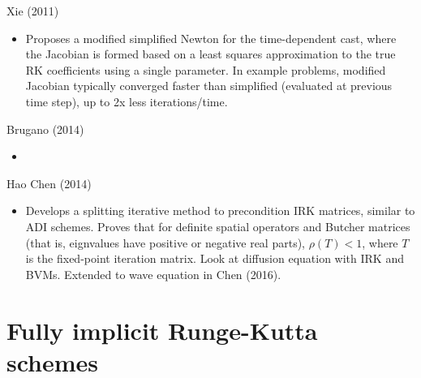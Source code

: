\documentclass[a4paper,10pt]{article}
\begin{document}
Xie (2011)
\begin{itemize}
	\item Proposes a modified simplified Newton for the time-dependent cast, where the Jacobian is
	formed based on a least squares approximation to the true RK coefficients using a single parameter. In example
	problems, modified Jacobian typically converged faster than simplified (evaluated at previous
	time step), up to 2x less iterations/time. 
\end{itemize}

Brugano (2014)
\begin{itemize}
	\item
\end{itemize}

Hao Chen (2014)
\begin{itemize}
	\item Develops a splitting iterative method to precondition IRK matrices, similar to ADI schemes.
	Proves that for definite spatial operators and Butcher matrices (that is, eignvalues have positive
	or negative real parts), $\rho(T) < 1$, where $T$ is the fixed-point iteration matrix. Look at 
	diffusion equation with IRK and BVMs. Extended to wave equation in Chen (2016).
\end{itemize}




\section{Fully implicit Runge-Kutta schemes}
\end{document}
